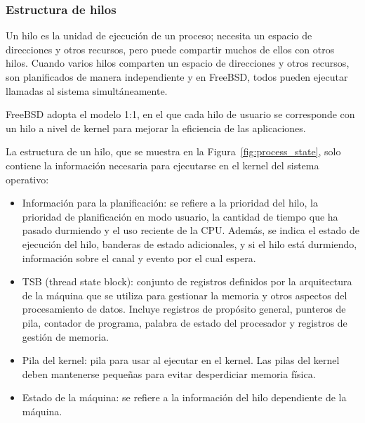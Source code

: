 \subsubsection{Estructura de hilos}
Un hilo es la unidad de ejecución de un proceso; necesita un espacio de direcciones y otros recursos, pero puede compartir muchos de ellos con otros hilos. Cuando varios hilos comparten un espacio de direcciones y otros recursos, son planificados de manera independiente y en FreeBSD, todos pueden ejecutar llamadas al sistema simultáneamente.\par

FreeBSD adopta el modelo 1:1, en el que cada hilo de usuario se corresponde con un hilo a nivel de kernel para mejorar la eficiencia de las aplicaciones.\par

La estructura de un hilo, que se muestra en la Figura~\ref{fig:process_state}, solo contiene la información necesaria para ejecutarse en el kernel del sistema operativo:

\begin{itemize}
    \item Información para la planificación: se refiere a la prioridad del hilo, la prioridad de planificación en modo usuario, la cantidad de tiempo que ha pasado durmiendo y el uso reciente de la CPU. Además, se indica el estado de ejecución del hilo, banderas de estado adicionales, y si el hilo está durmiendo, información sobre el canal y evento por el cual espera.
    \item TSB (thread state block): conjunto de registros definidos por la arquitectura de la máquina que se utiliza para gestionar la memoria y otros aspectos del procesamiento de datos. Incluye registros de propósito general, punteros de pila, contador de programa, palabra de estado del procesador y registros de gestión de memoria.
    \item Pila del kernel: pila para usar al ejecutar en el kernel. Las pilas del kernel deben mantenerse pequeñas para evitar desperdiciar memoria física.
    \item Estado de la máquina: se refiere a la información del hilo dependiente de la máquina.
\end{itemize}
